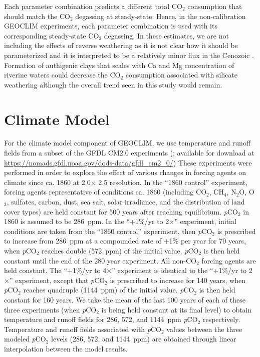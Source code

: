 \documentclass[11pt,letterpaper]{article}
\newcommand{\degrees}{\textdegree\xspace}
\newcommand{\pCOtwo}{\textit{p}CO$_{2}$\xspace}
\newcommand{\COtwo}{CO$_{2}$\xspace}
\begin{document}
Each parameter combination predicts a different total \COtwo consumption that should match the \COtwo degassing at steady-state. Hence, in the non-calibration GEOCLIM experiments, each parameter combination is used with its corresponding steady-state \COtwo degassing. In these estimates, we are not including the effects of reverse weathering \citep{Michalopoulos1995a} as it is not clear how it should be parameterized and it is interpreted to be a relatively minor flux in the Cenozoic \citep{Isson2018a}. Formation of authigenic clays that scales with Ca and Mg concentration of riverine waters could decrease the \COtwo consumption associated with silicate weathering although the overall trend seen in this study would remain.

\section*{Climate Model}

For the climate model component of GEOCLIM, we use temperature and runoff fields from a subset of the GFDL CM2.0 experiments (\citealp{Delworth2006a, Delworth2006b}; available for download at \url{https://nomads.gfdl.noaa.gov/dods-data/gfdl_cm2_0/}) These experiments were performed in order to explore the effect of various changes in forcing agents on climate since ca. 1860 at 2.0\degrees $\times$ 2.5\degrees resolution. In the ``1860 control'' experiment, forcing agents representative of conditions ca. 1860 (including \COtwo, CH$_{4}$, N$_{2}$O, O$_{3}$, sulfates, carbon, dust, sea salt, solar irradiance, and the distribution of land cover types) are held constant for 500 years after reaching equilibrium. \pCOtwo in 1860 is assumed to be 286~ppm. In the ``+1\%/yr to 2$\times$'' experiment, initial conditions are taken from the ``1860 control'' experiment, then \pCOtwo is prescribed to increase from 286~ppm at a compounded rate of +1\% per year for 70 years, when \pCOtwo reaches double (572~ppm) of the initial value. \pCOtwo is then held constant until the end of the 280 year experiment. All non-\COtwo forcing agents are held constant. The ``+1\%/yr to 4$\times$'' experiment is identical to the ``+1\%/yr to 2$\times$'' experiment, except that \pCOtwo is prescribed to increase for 140 years, when \pCOtwo reaches quadruple (1144~ppm) of the initial value. \pCOtwo is then held constant for 160 years. We take the mean of the last 100 years of each of these three experiments (when \pCOtwo is being held constant at its final level) to obtain temperature and runoff fields for 286, 572, and 1144~ppm \pCOtwo respectively. Temperature and runoff fields associated with \pCOtwo values between the three modeled \pCOtwo levels (286, 572, and 1144~ppm) are obtained through linear interpolation between the model results.
\end{document}
